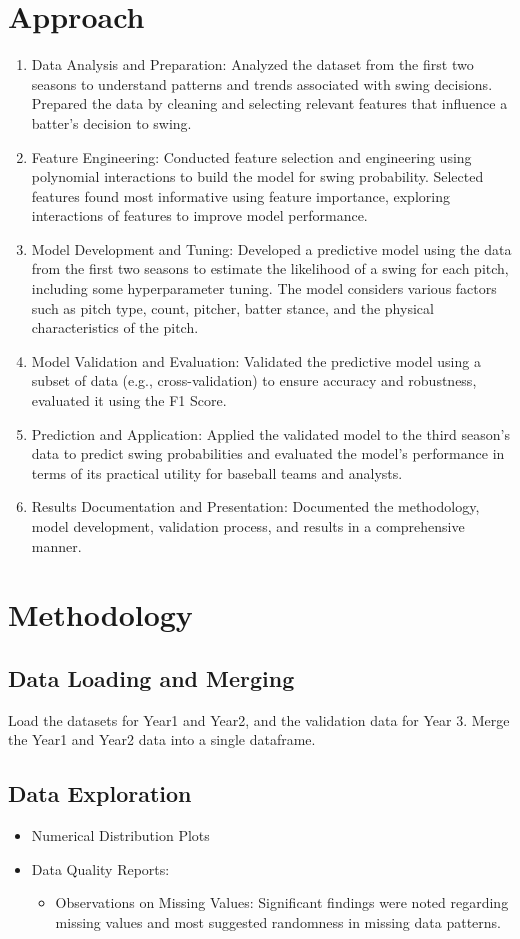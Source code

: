 \documentclass{article}
\begin{document}
\section*{Approach}
\begin{enumerate}
    \item Data Analysis and Preparation: Analyzed the dataset from the first two seasons to understand patterns and trends associated with swing decisions. Prepared the data by cleaning and selecting relevant features that influence a batter's decision to swing.
    \item Feature Engineering: Conducted feature selection and engineering using polynomial interactions to build the model for swing probability. Selected features found most informative using feature importance, exploring interactions of features to improve model performance.
    \item Model Development and Tuning: Developed a predictive model using the data from the first two seasons to estimate the likelihood of a swing for each pitch, including some hyperparameter tuning. The model considers various factors such as pitch type, count, pitcher, batter stance, and the physical characteristics of the pitch.
    \item Model Validation and Evaluation: Validated the predictive model using a subset of data (e.g., cross-validation) to ensure accuracy and robustness, evaluated it using the F1 Score.
    \item Prediction and Application: Applied the validated model to the third season's data to predict swing probabilities and evaluated the model’s performance in terms of its practical utility for baseball teams and analysts.
    \item Results Documentation and Presentation: Documented the methodology, model development, validation process, and results in a comprehensive manner.
\end{enumerate}

\section*{Methodology}
\subsection*{Data Loading and Merging}
Load the datasets for Year1 and Year2, and the validation data for Year 3. Merge the Year1 and Year2 data into a single dataframe.

\subsection*{Data Exploration}
\begin{itemize}
    \item Numerical Distribution Plots
    \item Data Quality Reports:
    \begin{itemize}
        \item Observations on Missing Values: Significant findings were noted regarding missing values and most suggested randomness in missing data patterns.
    \end{itemize}
\end{itemize}
\end{document}
